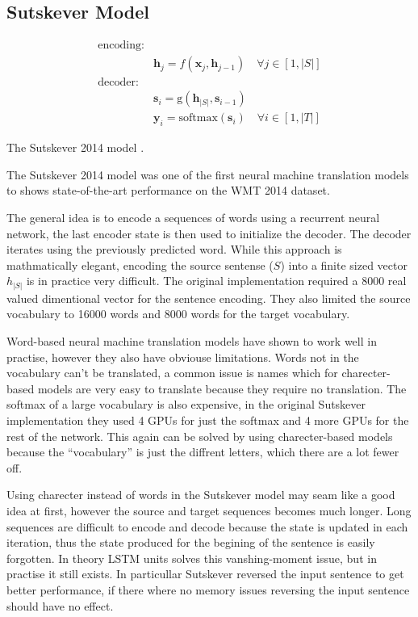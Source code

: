 \subsection{Sutskever Model}

\begin{equationbox}[H]
\begin{equation*}
\begin{aligned}
\text{encoding:} & \\
& \mathbf{h}_j = f(\mathbf{x}_j, \mathbf{h}_{j-1}) \quad \forall j \in [1, |S|] \\
\text{decoder:} & \\
&\mathbf{s}_i = \mathrm{g}(\mathbf{h}_{|S|}, \mathbf{s}_{i-1}) \\
&\mathbf{y}_i = \mathrm{softmax}(\mathbf{s}_i) \quad \forall i \in [1, |T|] 
\end{aligned}
\end{equation*}
\caption{The Sutskever 2014 model \cite{sutskever-2014-nmt}.}
\end{equationbox}

The Sutskever 2014 model \cite{sutskever-2014-nmt} was one of the first neural machine translation models to shows state-of-the-art performance on the WMT 2014 dataset.

The general idea is to encode a sequences of words using a recurrent neural network, the last encoder state is then used to initialize the decoder. The decoder iterates using the previously predicted word. While this approach is mathmatically elegant, encoding the source sentense ($S$) into a finite sized vector $h_{|S|}$ is in practice very difficult. The original implementation required a 8000 real valued dimentional vector for the sentence encoding. They also limited the source vocabulary to 16000 words and 8000 words for the target vocabulary.

Word-based neural machine translation models have shown to work well in practise, however they also have obviouse limitations. Words not in the vocabulary can't be translated, a common issue is names which for charecter-based models are very easy to translate because they require no translation. The softmax of a large vocabulary is also expensive, in the original Sutskever implementation they used 4 GPUs for just the softmax and 4 more GPUs for the rest of the network. This again can be solved by using charecter-based models because the ``vocabulary'' is just the diffrent letters, which there are a lot fewer off.

Using charecter instead of words in the Sutskever model may seam like a good idea at first, however the source and target sequences becomes much longer. Long sequences are difficult to encode and decode because the state is updated in each iteration, thus the state produced for the begining of the sentence is easily forgotten. In theory LSTM units solves this vanshing-moment issue, but in practise it still exists. In particullar Sutskever reversed the input sentence to get better performance, if there where no memory issues reversing the input sentence should have no effect.

